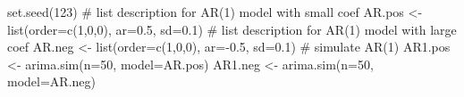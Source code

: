 \begin{Schunk}
\begin{Sinput}
 set.seed(123)
 # list description for AR(1) model with small coef
 AR.pos <- list(order=c(1,0,0), ar=0.5, sd=0.1)
 # list description for AR(1) model with large coef
 AR.neg <- list(order=c(1,0,0), ar=-0.5, sd=0.1)
 # simulate AR(1)
 AR1.pos <- arima.sim(n=50, model=AR.pos)
 AR1.neg <- arima.sim(n=50, model=AR.neg)
\end{Sinput}
\end{Schunk}

